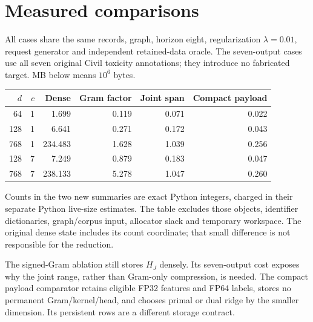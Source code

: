 \documentclass[11pt,a4paper]{article}
\begin{document}
\section*{Measured comparisons}
All cases share the same records, graph, horizon eight, regularization
$\lambda=0.01$, request generator and independent retained-data oracle.
The seven-output cases use all seven original Civil toxicity annotations;
they introduce no fabricated target. MB below means $10^6$ bytes.
\begin{center}\small
\begin{tabular}{rrrrrr}\toprule
$d$ & $c$ & Dense & Gram factor & Joint span & Compact payload\\\midrule
64 & 1 & 1.699 & 0.119 & 0.071 & 0.022 \\
128 & 1 & 6.641 & 0.271 & 0.172 & 0.043 \\
768 & 1 & 234.483 & 1.628 & 1.039 & 0.256 \\
128 & 7 & 7.249 & 0.879 & 0.183 & 0.047 \\
768 & 7 & 238.133 & 5.278 & 1.047 & 0.260 \\
\bottomrule\end{tabular}\end{center}
Counts in the two new summaries are exact Python integers, charged in their
separate Python live-size estimates. The table excludes those objects,
identifier dictionaries, graph/corpus input, allocator slack and temporary
workspace. The original dense state includes its count coordinate; that
small difference is not responsible for the reduction.

The signed-Gram ablation still stores $H_J$ densely. Its seven-output cost
exposes why the joint range, rather than Gram-only compression, is needed.
The compact payload comparator retains eligible FP32 features and FP64 labels,
stores no permanent Gram/kernel/head, and chooses primal or dual ridge by the
smaller dimension. Its persistent rows are a different storage contract.
\end{document}
